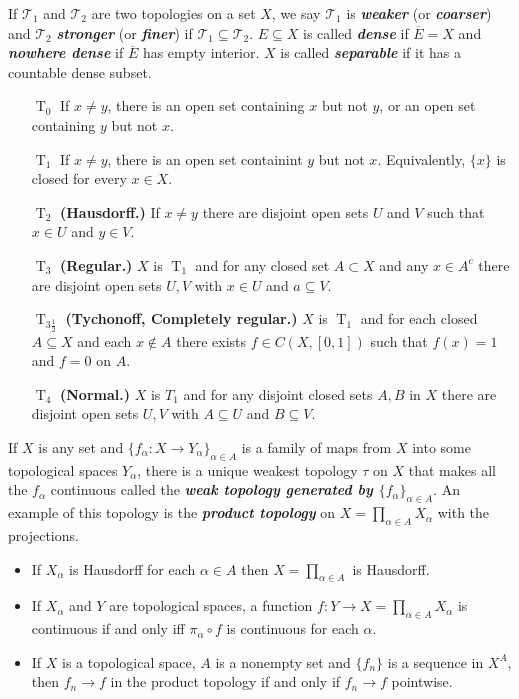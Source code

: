 \documentclass{article}
\theoremstyle{definition}
\numberwithin{equation}{section}
\begin{document}
	
	If $\mathcal{T}_1$ and $\mathcal{T}_2$ are two topologies on a set $X$, we say $\mathcal{T}_1$ is \textbf{\textit{weaker}} (or \textbf{\textit{coarser}}) and $\mathcal{T}_2$ \textbf{\textit{stronger}} (or \textbf{\textit{finer}}) if $\mathcal{T}_1\subseteq\mathcal{T}_2$. $E\subseteq X$ is called \textbf{\textit{dense}} if $\overline{E}=X$ and \textbf{\textit{nowhere dense}} if $\overline{E}$ has empty interior. $X$ is called \textbf{\textit{separable}} if it has a countable dense subset. 
	
	\begin{enumerate}
		\item[$\operatorname{T}_0$] If $x\neq y$, there is an open set containing $x$ but not $y$, or an open set containing $y$ but not $x$.
		\item[$\operatorname{T}_1$] If $x\neq y$, there is an open set containint $y$ but not $x$. Equivalently, $\{x\}$ is closed for every $x\in X$.
		\item[$\operatorname{T}_2$] \textbf{(Hausdorff.)} If $x\neq y$ there are disjoint open sets $U$ and $V$ such that $x\in U$ and $y\in V$.
		\item[$\operatorname{T}_3$] \textbf{(Regular.)} $X$ is $\operatorname{T}_1$ and for any closed set $A\subset X$ and any $x\in A^c$ there are disjoint open sets $U,V$ with $x\in U$ and $a\subseteq V$.
		\item[$\operatorname{T}_{3\frac{1}{2}}$] \textbf{(Tychonoff, Completely regular.)} $X$ is $\operatorname{T}_1$ and for each closed $A\subseteq X$ and each $x\notin A$ there exists $f\in C(X,[0,1])$ such that $f(x)=1$ and $f=0$ on $A$.
		\item[$\operatorname{T}_4$] \textbf{(Normal.)} $X$ is $T_1$ and for any disjoint closed sets $A,B$ in $X$ there are disjoint open sets $U,V$ with $A\subseteq U$ and $B\subseteq V$.
	\end{enumerate}
	
	If $X$ is any set and $\{f_\alpha:X\to Y_\alpha\}_{\alpha\in A}$ is a family of maps from $X$ into some topological spaces $Y_\alpha$, there is a unique weakest topology $\tau$ on $X$ that makes all the $f_\alpha$ continuous called the \textbf{\textit{weak topology generated by $\{f_\alpha\}_{\alpha\in A}$}}. An example of this topology is the \textbf{\textit{product topology}} on $X=\prod_{\alpha\in A}X_\alpha$ with the projections.
	
	\begin{prop}\leavevmode
		\begin{itemize}
			\item If $X_\alpha$ is Hausdorff for each $\alpha\in A$ then $X=\prod_{\alpha\in A}$ is Hausdorff.
			\item If $X_\alpha$ and $Y$ are topological spaces, a function $f:Y\to X=\prod_{\alpha\in A}X_\alpha$ is continuous if and only iff $\pi_\alpha\circ f$ is continuous for each $\alpha$.
			\item If $X$ is a topological space, $A$ is a nonempty set and $\{f_n\}$ is a sequence in $X^A$, then $f_n\to f$ in the product topology if and only if $f_n\to f$ pointwise.
		\end{itemize}
	\end{prop}
	
\end{document}
